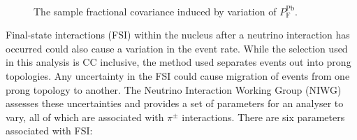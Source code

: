 \begin{figure}%
  \centering
  \\
  \caption{The sample fractional covariance induced by variation of $P_{\textrm{F}}^{\textrm{Pb}}$.}
  \label{fig:PbXSecCovarianceMatrices}
\end{figure}
\newline
\newline
Final-state interactions (FSI) within the nucleus after a neutrino interaction has occurred could also cause a variation in the event rate.  While the selection used in this analysis is CC inclusive, the method used separates events out into prong topologies.  Any uncertainty in the FSI could cause migration of events from one prong topology to another.  The Neutrino Interaction Working Group (NIWG) assesses these uncertainties and provides a set of parameters for an analyser to vary, all of which are associated with $\pi^{\pm}$ interactions.  There are six parameters associated with FSI:
